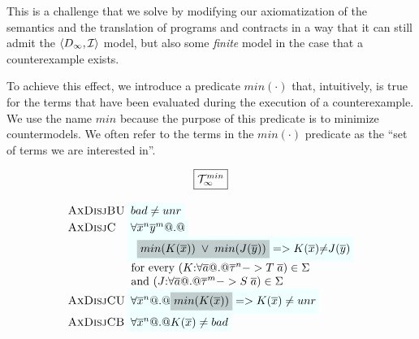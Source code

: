 This is a challenge that we solve by modifying our axiomatization of the semantics 
and the translation of programs and contracts in a way that it can still admit 
the $\langle D_\infty,{\cal I}\rangle$ model, but also some {\em finite} model in 
the case that a counterexample exists. 

To achieve this effect, we introduce a predicate $min(\cdot)$ that, intuitively, is true
for the terms that have been evaluated during the execution of a counterexample. We use the
name $min$ because the purpose of this predicate is to minimize countermodels. We often 
refer to the terms in the $min(\cdot)$ predicate as the ``set of terms we are interested in''.

\begin{figure} 
{\small
\[\setlength{\arraycolsep}{1pt}
\begin{array}{c}
\ruleform{\Th_\infty^{min}} \\ \\ 
\begin{array}{lll}
 \textsc{AxDisjBU} & \formula{\bad \neq \unr} \\ 
 \textsc{AxDisjC} & \formula{\forall \oln{x}{n}\oln{y}{m} @.@} \\ 
                  & \formula{\;\;\highlight{min(K(\ol{x}))\;\lor\;min(J(\ol{y}))} =>
                                  K(\ol{x}){\neq}J(\ol{y})} \\
                  & \text{ for every } (K{:}\forall\as @.@ \oln{\tau}{n} -> T\;\as) \in \Sigma \\ 
                  & \text{ and } (J{:}\forall\as @.@ \oln{\tau}{m} -> S\;\as) \in \Sigma \\
 \textsc{AxDisjCU} & \formula{\forall \oln{x}{n} @.@ \highlight{min(K(\ol{x}))} => K(\ol{x}) \neq unr} \\
 \textsc{AxDisjCB} & \formula{\forall \oln{x}{n} @.@ K(\ol{x}) \neq \bad} \\ 


\end{array}
\end{array}\]}
\end{figure}
